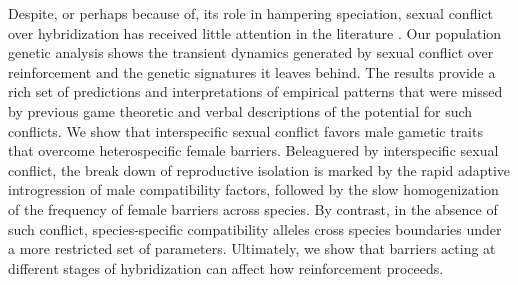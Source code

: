 \documentclass[11pt]{article}
\begin{document}
Despite, or perhaps because of, its role in hampering speciation, sexual conflict over hybridization has received little attention in the literature \citep[but see ][]{Parker1998, Parker and Partridge, Gavrilets}.  
Our population genetic analysis shows the transient dynamics generated by sexual conflict over reinforcement and the genetic signatures it leaves behind. 
The results provide a rich set of predictions and interpretations of empirical patterns that were missed by previous game theoretic \citep{parkerpartridge, gavrilets} and verbal \citep{Coyne} descriptions of the potential for such conflicts. 
We show that interspecific sexual conflict favors male gametic traits that overcome heterospecific female barriers. 
Beleaguered by interspecific sexual conflict, the break down of reproductive isolation is marked by the rapid adaptive introgression of male compatibility factors, followed by the slow homogenization of the frequency of female barriers across species. 
By contrast, in the absence of such conflict, species-specific compatibility alleles  cross species boundaries under a more restricted set of parameters.
Ultimately, we show that barriers acting at different stages of hybridization can affect how reinforcement proceeds.
\end{document}
